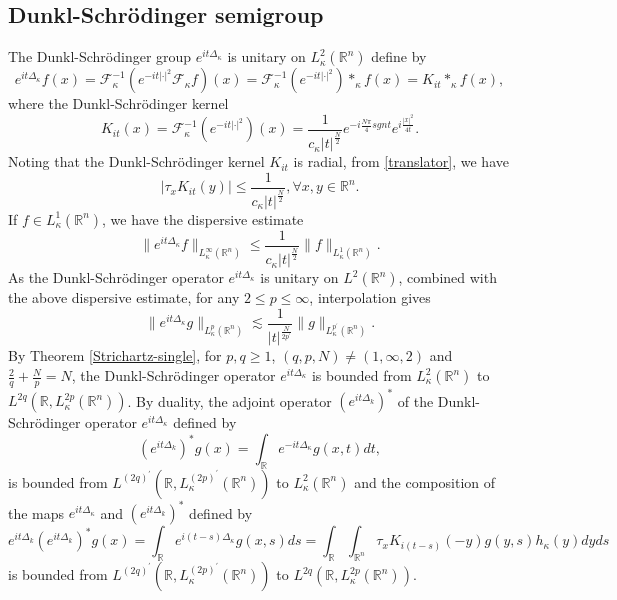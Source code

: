 \documentclass[a4paper,11pt, reqno]{amsart}
\numberwithin{equation}{section}
\theoremstyle{plain}
\theoremstyle{definition}
\theoremstyle{remark}
\begin{document}
\subsection{Dunkl-Schr\"{o}dinger semigroup}
The Dunkl-Schr\"{o}dinger group $e^{it\Delta_\kappa}$ is unitary on $L^2_\kappa(\mathbb{R}^n)$ define by
\begin{equation*}
e^{it\Delta_\kappa}f(x)=\mathcal{F}^{-1}_\kappa\left(e^{-it|\cdot|^2} \mathcal{F}_\kappa f\right)(x)=\mathcal{F}^{-1}_\kappa\left(e^{-it|\cdot|^2}\right)*_\kappa f(x)=K_{it}*_\kappa f(x),
\end{equation*}
where the Dunkl-Schr\"{o}dinger kernel
\begin{equation}\label{Schrodinger}
K_{it}(x)=\mathcal{F}^{-1}_\kappa\left(e^{-it|\cdot|^2}\right)(x)=\frac{1}{c_\kappa |t|^\frac{N}{2}}e^{-i\frac{N\pi}{4} sgn t}e^{i\frac{|x|^2}{4t}}.
\end{equation}
Noting that the Dunkl-Schr\"{o}dinger kernel $K_{it}$ is radial, from \eqref{translator}, we have 
\begin{equation}\label{translator-decay}
\left|\tau_x K_{it}(y)\right|\leq \frac{1}{c_\kappa |t|^\frac{N}{2}},\forall x,y\in\mathbb{R}^n.
\end{equation}
If $f\in L_\kappa^1(\mathbb{R}^n)$, we have the dispersive estimate
\begin{equation*}
\|e^{it\Delta_\kappa}f\|_{L_\kappa^\infty(\mathbb{R}^n)}\leq \frac{1}{c_\kappa |t|^\frac{N}{2}}\|f\|_{L_\kappa^1(\mathbb{R}^n)}.
\end{equation*}
As the Dunkl-Schr\"{o}dinger operator $e^{it\Delta_\kappa}$ is unitary on $L^2(\mathbb{R}^n)$, combined with the above dispersive estimate,  for any $2\leq p\leq \infty$, interpolation gives
\begin{equation}\label{dispersive}
    \|e^{it\Delta_\kappa}g\|_{L_\kappa^{p}(\mathbb{R}^n)}\lesssim \frac{1}{|t|^\frac{N}{2p^\prime}} \|g\|_{L_\kappa^{p^\prime}(\mathbb{R}^n)}.
\end{equation}
By Theorem \ref{Strichartz-single}, for $p,q\geq1$, $(q,p,N)\neq (1,\infty,2)$ and $\frac{2}{q}+\frac{N}{p}=N$, the Dunkl-Schr\"{o}dinger operator $e^{it\Delta_\kappa}$ is bounded from $L_\kappa^2(\mathbb{R}^n)$ to $L^{2q}(\mathbb{R}, L_\kappa^{2p}(\mathbb{R}^n))$. By duality, the adjoint operator $\left(e^{it\Delta_k}\right)^*$ of the Dunkl-Schr\"{o}dinger operator $e^{it\Delta_\kappa}$ defined by
\begin{equation*}
\left(e^{it\Delta_k}\right)^*g(x)=\int_{\mathbb{R}}e^{-it\Delta_\kappa} g(x,t)dt,
\end{equation*}
is bounded from $L^{(2q)^\prime}(\mathbb{R}, L_\kappa^{(2p)^\prime}(\mathbb{R}^n))$ to $L_\kappa^2(\mathbb{R}^n)$ and the composition of the maps $e^{it\Delta_\kappa}$ and $\left(e^{it\Delta_k}\right)^*$ defined by
\begin{equation*}
e^{it\Delta_k}\left(e^{it\Delta_k}\right)^*g(x)=\int_{\mathbb{R}}e^{i(t-s)\Delta_\kappa} g(x,s)ds=\int_\mathbb{R} \int_{\mathbb{R}^n}\tau_xK_{i(t-s)}(-y)g(y,s)h_\kappa(y)dyds
\end{equation*}
is bounded from $L^{(2q)^\prime}(\mathbb{R}, L_\kappa^{(2p)^\prime}(\mathbb{R}^n))$ to $L^{2q}(\mathbb{R}, L_\kappa^{2p}(\mathbb{R}^n))$.
\end{document}
